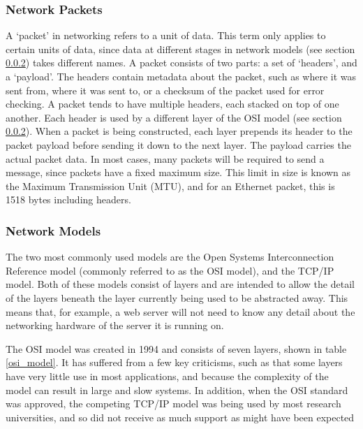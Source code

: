 %

\subsubsection{Network Packets}
\label{network_packets}

A `packet' in networking refers to a unit of data. This term only applies to certain units of data, since data at different stages in network models (see section \ref{network_models}) takes different names. A packet consists of two parts: a set of `headers', and a `payload'. The headers contain metadata about the packet, such as where it was sent from, where it was sent to, or a checksum of the packet used for error checking. A packet tends to have multiple headers, each stacked on top of one another. Each header is used by a different layer of the OSI model (see section \ref{network_models}). When a packet is being constructed, each layer prepends its header to the packet payload before sending it down to the next layer. The payload carries the actual packet data. In most cases, many packets will be required to send a message, since packets have a fixed maximum size. This limit in size is known as the Maximum Transmission Unit (MTU), and for an Ethernet packet, this is 1518 bytes including headers.

\subsubsection{Network Models}
\label{network_models}
The two most commonly used models are the Open Systems Interconnection Reference model (commonly referred to as the OSI model), and the TCP/IP model. Both of these models consist of layers and are intended to allow the detail of the layers beneath the layer currently being used to be abstracted away. This means that, for example, a web server will not need to know any detail about the networking hardware of the server it is running on.

The OSI model was created in 1994 \cite{iec7498_1_1994} and consists of seven layers, shown in table \ref{osi_model}. It has suffered from a few key criticisms, such as that some layers have very little use in most applications, and because the complexity of the model can result in large and slow systems. In addition, when the OSI standard was approved, the competing TCP/IP model was being used by most research universities, and so did not receive as much support as might have been expected

